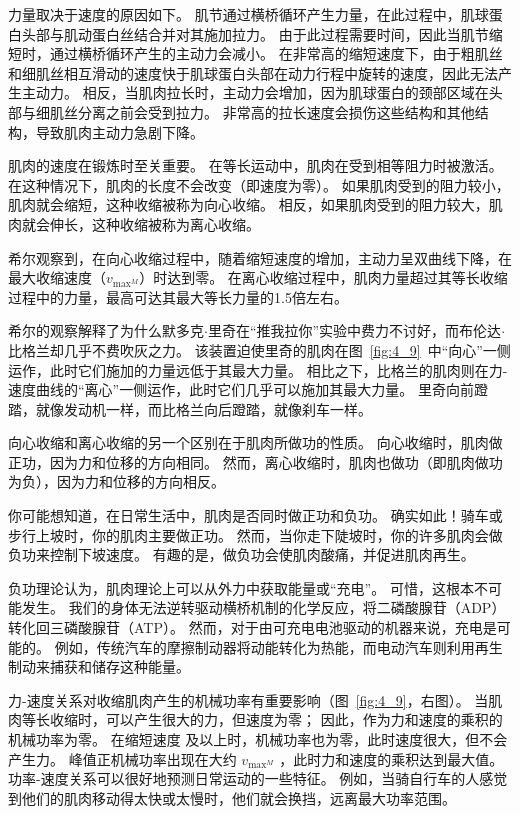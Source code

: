 力量取决于速度的原因如下。
肌节通过横桥循环产生力量，在此过程中，肌球蛋白头部与肌动蛋白丝结合并对其施加拉力。
由于此过程需要时间，因此当肌节缩短时，通过横桥循环产生的主动力会减小。
在非常高的缩短速度下，由于粗肌丝和细肌丝相互滑动的速度快于肌球蛋白头部在动力行程中旋转的速度，因此无法产生主动力。
相反，当肌肉拉长时，主动力会增加，因为肌球蛋白的颈部区域在头部与细肌丝分离之前会受到拉力。
非常高的拉长速度会损伤这些结构和其他结构，导致肌肉主动力急剧下降。


肌肉的速度在锻炼时至关重要。
在等长运动中，肌肉在受到相等阻力时被激活。
在这种情况下，肌肉的长度不会改变（即速度为零）。
如果肌肉受到的阻力较小，肌肉就会缩短，这种收缩被称为向心收缩。
相反，如果肌肉受到的阻力较大，肌肉就会伸长，这种收缩被称为离心收缩。


希尔观察到，在向心收缩过程中，随着缩短速度的增加，主动力呈双曲线下降，在最大收缩速度（$v_{\text{max}^M}$）时达到零。
在离心收缩过程中，肌肉力量超过其等长收缩过程中的力量，最高可达其最大等长力量的1.5倍左右。


希尔的观察解释了为什么默多克$\cdot$里奇在“推我拉你”实验中费力不讨好，而布伦达$\cdot$比格兰却几乎不费吹灰之力。
该装置迫使里奇的肌肉在图~\ref{fig:4_9}~中“向心”一侧运作，此时它们施加的力量远低于其最大力量。
相比之下，比格兰的肌肉则在力-速度曲线的“离心”一侧运作，此时它们几乎可以施加其最大力量。
里奇向前蹬踏，就像发动机一样，而比格兰向后蹬踏，就像刹车一样。


向心收缩和离心收缩的另一个区别在于肌肉所做功的性质。
向心收缩时，肌肉做正功，因为力和位移的方向相同。
然而，离​​心收缩时，肌肉也做功（即肌肉做功为负），因为力和位移的方向相反。


你可能想知道，在日常生活中，肌肉是否同时做正功和负功。
确实如此！骑车或步行上坡时，你的肌肉主要做正功。
然而，当你走下陡坡时，你的许多肌肉会做负功来控制下坡速度。
有趣的是，做负功会使肌肉酸痛，并促进肌肉再生。


负功理论认为，肌肉理论上可以从外力中获取能量或“充电”。
可惜，这根本不可能发生。
我们的身体无法逆转驱动横桥机制的化学反应，将二磷酸腺苷（ADP）转化回三磷酸腺苷（ATP）。
然而，对于由可充电电池驱动的机器来说，充电是可能的。
例如，传统汽车的摩擦制动器将动能转化为热能，而电动汽车则利用再生制动来捕获和储存这种能量。


力-速度关系对收缩肌肉产生的机械功率有重要影响（图~\ref{fig:4_9}，右图）。
当肌肉等长收缩时，可以产生很大的力，但速度为零；
因此，作为力和速度的乘积的机械功率为零。
在缩短速度 及以上时，机械功率也为零，此时速度很大，但不会产生力。
峰值正机械功率出现在大约 $v_{\text{max}^M}$ ，此时力和速度的乘积达到最大值。
功率-速度关系可以很好地预测日常运动的一些特征。
例如，当骑自行车的人感觉到他们的肌肉移动得太快或太慢时，他们就会换挡，远离最大功率范围。


